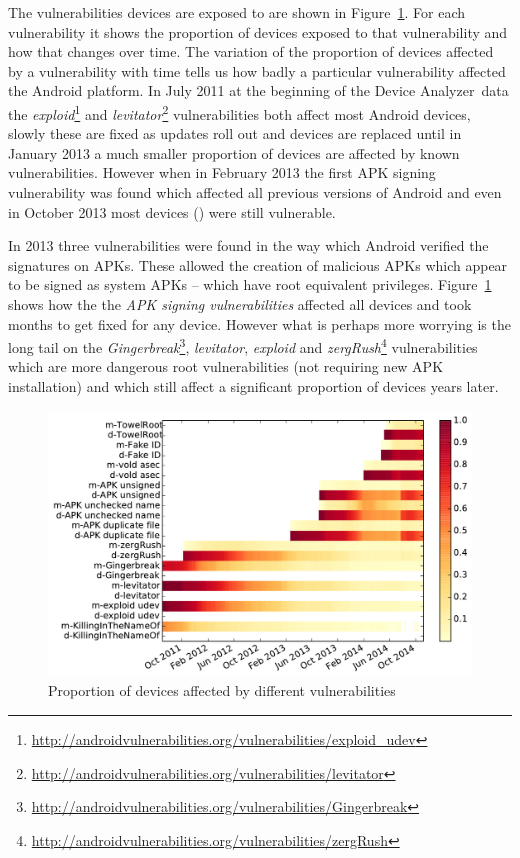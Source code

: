 \documentclass[conference,a4paper,twoside]{IEEEtran}
\newcommand{\da}{Device Analyzer}
\begin{document}
The vulnerabilities devices are exposed to are shown in Figure~\ref{fig:nvulnerabilities_heat}.
For each vulnerability it shows the proportion of devices exposed to that vulnerability and how that changes over time.
The variation of the proportion of devices affected by a vulnerability with time tells us how badly a particular vulnerability affected the Android platform.
In July 2011 at the beginning of the \da\ data the \emph{exploid}\footnote{\url{http://androidvulnerabilities.org/vulnerabilities/exploid_udev}} and \emph{levitator}\footnote{\url{http://androidvulnerabilities.org/vulnerabilities/levitator}} vulnerabilities both affect most Android devices, slowly these are fixed as updates roll out and devices are replaced until in January 2013 a much smaller proportion of devices are affected by known vulnerabilities.
However when in February 2013 the first APK signing vulnerability was found which affected all previous versions of Android and even in October 2013 most devices (\daVulnAPKDuplicateFileOctoberPerc) were still vulnerable.

In 2013 three vulnerabilities were found in the way which Android verified the signatures on APKs.
These allowed the creation of malicious APKs which appear to be signed as system APKs -- which have root equivalent privileges.
Figure~\ref{fig:nvulnerabilities_heat} shows how the the \emph{APK signing vulnerabilities} affected all devices and took months to get fixed for any device.
However what is perhaps more worrying is the long tail on the \emph{Gingerbreak}\footnote{\url{http://androidvulnerabilities.org/vulnerabilities/Gingerbreak}}, \emph{levitator}, \emph{exploid} and \emph{zergRush}\footnote{\url{http://androidvulnerabilities.org/vulnerabilities/zergRush}} vulnerabilities which are more dangerous root vulnerabilities (not requiring new APK installation) and which still affect a significant proportion of devices years later.


\begin{figure}
 \includegraphics[width=\columnwidth]{figures/nvulnerabilities_heat.pdf}
 \caption{Proportion of devices affected by different vulnerabilities}
 \label{fig:nvulnerabilities_heat}
\end{figure}
\end{document}
